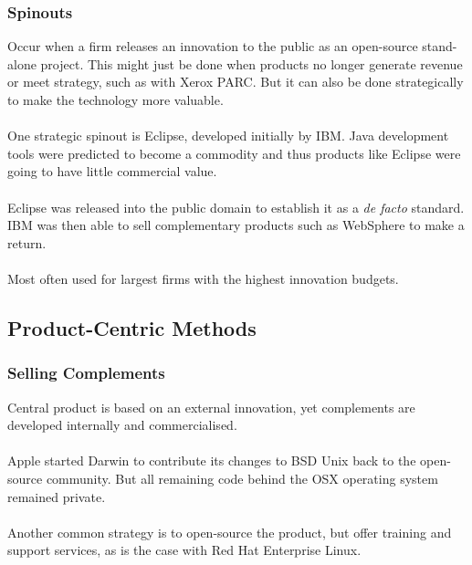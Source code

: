 \documentclass{beamer}
\begin{document}

\begin{frame}
\frametitle{Spinouts}
Occur when a firm releases an innovation to the public as an open-source stand-alone project. This might just be done when products no longer generate revenue or meet strategy, such as with Xerox PARC. But it can also be done strategically to make the technology more valuable.\\~\\

One strategic spinout is Eclipse, developed initially by IBM. Java development tools were predicted to become a commodity and thus products like Eclipse were going to have little commercial value.\\~\\

Eclipse was released into the public domain to establish it as a \textit{de facto} standard. IBM was then able to sell complementary products such as WebSphere to make a return.\\~\\

Most often used for largest firms with the highest innovation budgets.
\end{frame}

\subsection{Product-Centric Methods}

\begin{frame}
\frametitle{Selling Complements}
Central product is based on an external innovation, yet complements are developed internally and commercialised.\\~\\

Apple started Darwin to contribute its changes to BSD Unix back to the open-source community. But all remaining code behind the OSX operating system remained private.\\~\\

Another common strategy is to open-source the product, but offer training and support services, as is the case with Red Hat Enterprise Linux.
\end{frame}

\end{document}
